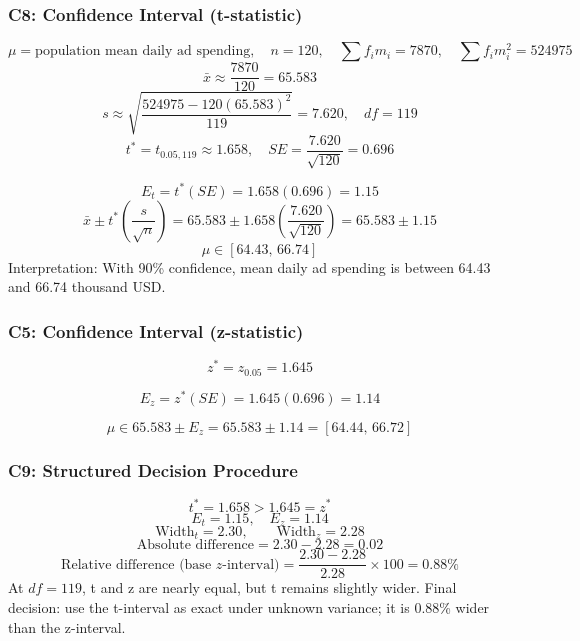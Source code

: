 \begin{ExamProblems}
		\subsubsection*{C8: Confidence Interval (t-statistic)}
		\[
		\mu=\text{population mean daily ad spending},\quad n=120,\quad \sum f_im_i=7870,\quad \sum f_im_i^2=524975
		\]
		\[
		\bar{x}\approx\frac{7870}{120}=65.583
		\]
		\[
		s\approx\sqrt{\frac{524975-120(65.583)^2}{119}}=7.620,\quad df=119
		\]
		\[
		t^*=t_{0.05,119}\approx 1.658,\quad SE=\frac{7.620}{\sqrt{120}}=0.696
		\]

		\[
		E_t=t^*(SE)=1.658(0.696)=1.15
		\]
		\[
		\bar{x}\pm t^*\left(\frac{s}{\sqrt{n}}\right)=65.583\pm 1.658\left(\frac{7.620}{\sqrt{120}}\right)=65.583\pm 1.15
		\]
		\[
		\mu\in[64.43,\,66.74]
		\]
		Interpretation: With 90\% confidence, mean daily ad spending is between 64.43 and 66.74 thousand USD.

		\subsubsection*{C5: Confidence Interval (z-statistic)}
		\[
		z^*=z_{0.05}=1.645
		\]

		\[
		E_z=z^*(SE)=1.645(0.696)=1.14
		\]

		\[
		\mu\in 65.583\pm E_z=65.583\pm 1.14=[64.44,\,66.72]
		\]

		\subsubsection*{C9: Structured Decision Procedure}
		\[
		t^*=1.658>1.645=z^*
		\]
		\[
		E_t=1.15,\quad E_z=1.14
		\]
		\[
		\text{Width}_t=2.30,\qquad \text{Width}_z=2.28
		\]
		\[
		\text{Absolute difference}=2.30-2.28=0.02
		\]
		\[
		\text{Relative difference (base }z\text{-interval)}=\frac{2.30-2.28}{2.28}\times 100=0.88\%
		\]
		At $df=119$, t and z are nearly equal, but t remains slightly wider.
		Final decision: use the t-interval as exact under unknown variance; it is 0.88\% wider than the z-interval.


\end{ExamProblems}
